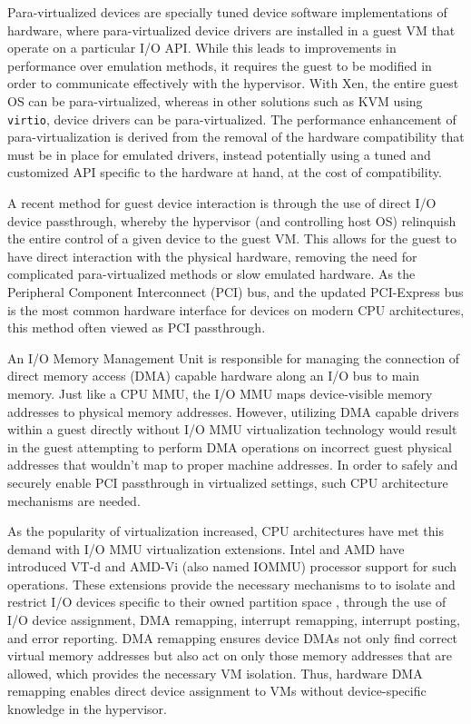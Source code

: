 Para-virtualized devices are specially tuned device software implementations of hardware, where para-virtualized device drivers are installed in a guest VM that operate on a particular I/O API.  While this leads to improvements in performance over emulation methods, it requires the guest to be modified in order to communicate effectively with the hypervisor. With Xen, the entire guest OS can be para-virtualized, whereas in other solutions such as KVM using \verb|virtio|, device drivers can be para-virtualized. The performance enhancement of para-virtualization is derived from the removal of the hardware compatibility that must be in place for emulated drivers, instead potentially using a tuned and customized API specific to the hardware at hand, at the cost of compatibility.  

A recent method for guest device interaction is through the use of direct I/O device passthrough, whereby the hypervisor (and controlling host OS) relinquish the entire control of a given device to the guest VM.  This allows for the guest to have direct interaction with the physical hardware, removing the need for complicated para-virtualized methods or slow emulated hardware.  As the Peripheral Component Interconnect (PCI) bus, and the updated PCI-Express bus is the most common hardware interface for devices on modern CPU architectures, this method often viewed as PCI passthrough.  

An I/O Memory Management Unit  is responsible for managing the connection of direct memory access (DMA) capable hardware along an I/O bus to main memory. Just like a CPU MMU, the I/O MMU maps device-visible memory addresses to physical memory addresses. However, utilizing DMA capable drivers within a guest directly without I/O MMU virtualization technology would result in the guest attempting to perform DMA operations on incorrect guest physical addresses that wouldn't map to proper machine addresses. In order to safely and securely enable PCI passthrough in virtualized settings, such CPU architecture mechanisms are needed. 

As the popularity of virtualization increased, CPU architectures have met this demand with I/O MMU virtualization extensions. Intel and AMD have introduced VT-d and AMD-Vi (also named IOMMU) processor support for such operations.  These extensions provide the necessary mechanisms to to isolate and restrict I/O devices specific to their owned partition space \cite{abramson2006vtd}, through the use of I/O device assignment, DMA remapping, interrupt remapping, interrupt posting, and error reporting. DMA remapping ensures device DMAs not only find correct virtual memory addresses but also act on only those memory addresses that are allowed, which provides the necessary VM isolation. Thus, hardware DMA remapping enables direct device assignment to VMs without device-specific knowledge in the hypervisor. 

